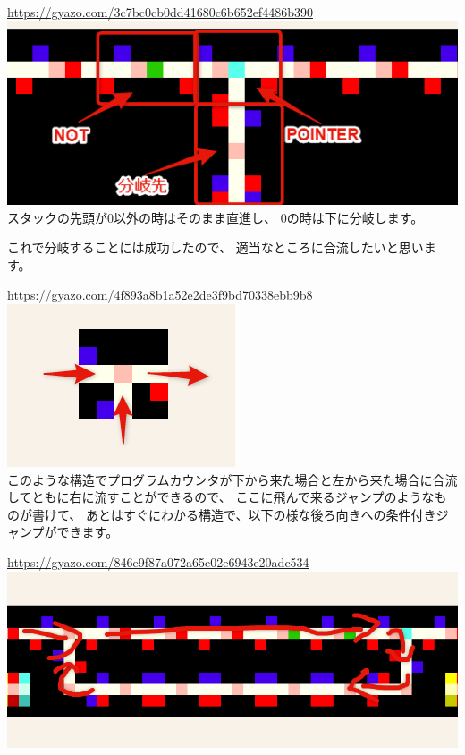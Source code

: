 \url{https://gyazo.com/3c7bc0cb0dd41680c6b652ef4486b390}\\
\href{https://gyazo.com/3c7bc0cb0dd41680c6b652ef4486b390}{\includegraphics[width=\textwidth]{images/3c7bc0cb0dd41680c6b652ef4486b390.png}} \\
スタックの先頭が0以外の時はそのまま直進し、
0の時は下に分岐します。

これで分岐することには成功したので、
適当なところに合流したいと思います。

\url{https://gyazo.com/4f893a8b1a52e2de3f9bd70338ebb9b8}\\
\href{https://gyazo.com/4f893a8b1a52e2de3f9bd70338ebb9b8}{\includegraphics{images/4f893a8b1a52e2de3f9bd70338ebb9b8.png}} \\
このような構造でプログラムカウンタが下から来た場合と左から来た場合に合流してともに右に流すことができるので、
ここに飛んで来るジャンプのようなものが書けて、
あとはすぐにわかる構造で、以下の様な後ろ向きへの条件付きジャンプができます。

\url{https://gyazo.com/846e9f87a072a65e02e6943e20adc534}\\
\href{https://gyazo.com/846e9f87a072a65e02e6943e20adc534}{\includegraphics[width=\textwidth]{images/846e9f87a072a65e02e6943e20adc534.png}}

